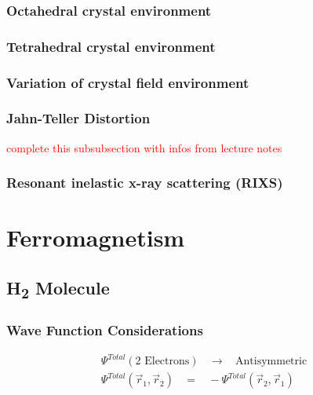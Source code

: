 \documentclass[10pt]{report}
\numberwithin{equation}{chapter}
\begin{document}
\subsubsection{Octahedral crystal environment}



\subsubsection{Tetrahedral crystal environment}


\subsubsection{Variation of crystal field environment}


\subsubsection{Jahn-Teller Distortion}

\textcolor{red}{complete this subsubsection with infos from lecture notes}


\subsubsection{Resonant inelastic x-ray scattering (RIXS)}



\section{Ferromagnetism}

\subsection{H\textsubscript{2} Molecule}

\subsubsection{Wave Function Considerations}

\begin{align}
  \Psi^{Total}(\text{2 Electrons})   ~~~~ \rightarrow ~~~~ \text{Antisymmetric}\\
  \Psi^{Total}(\vec{r}_1, \vec{r}_2) ~~~~ = ~~~~ - \Psi^{Total}(\vec{r}_2, \vec{r}_1)
\end{align}
\end{document}
